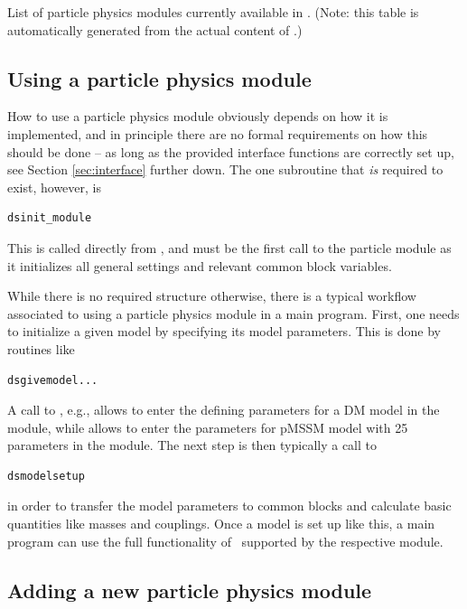 \begin{table}[t!]
[MODULESLIST]
\caption{List of particle physics modules currently available in . (Note: this table is automatically generated from the actual content of .)}
\label{tab:modules}
\end{table}


\subsection{Using a particle physics module}

How to use a particle physics module obviously depends on how it is implemented,
and in principle there are no formal requirements on how this should be done -- as long as the 
provided interface functions are correctly set up, see Section \ref{sec:interface} further down.
The one subroutine that {\it is} required to exist, however, is
\begin{verbatim}
dsinit_module
\end{verbatim}
This is called directly from , and must be the first call to the particle module 
as it initializes all general settings and relevant common block variables. 

While there is no required structure otherwise, there is a typical workflow associated to using
a particle physics module in a main program. First, one needs to initialize a given model
by specifying its model parameters. This is done by routines like
\begin{verbatim}
dsgivemodel...
\end{verbatim}
A call to , e.g., allows to enter the defining parameters for 
a DM model in the  module, while  allows 
to enter the parameters for pMSSM model with 25 parameters in the  module.
The next step is then typically a call to
\begin{verbatim}
dsmodelsetup
\end{verbatim}
in order to transfer the model parameters to common blocks and calculate basic quantities like
masses and couplings. Once a model is set up like this, a main program can use the full
functionality of \ds\ supported by the respective module.


\subsection{Adding a new particle physics module}


